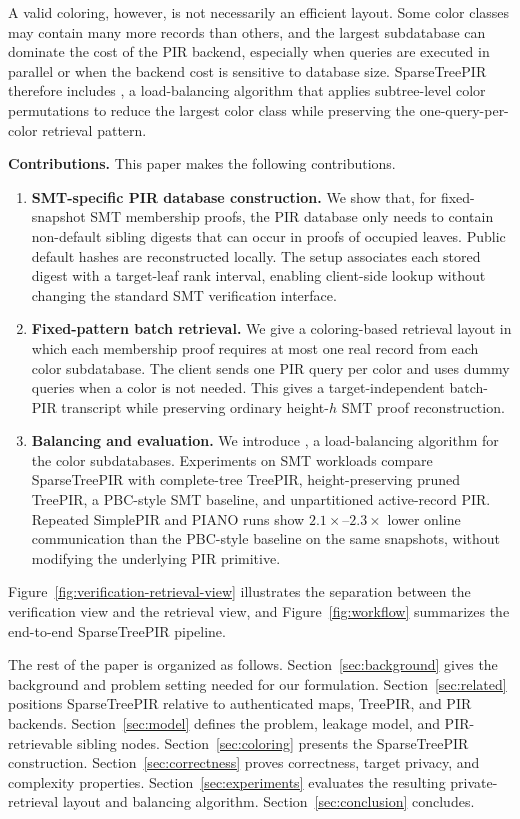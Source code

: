 A valid coloring, however, is not necessarily an efficient layout. Some color classes may contain many more records than others, and the largest subdatabase can dominate the cost of the PIR backend, especially when queries are executed in parallel or when the backend cost is sensitive to database size. SparseTreePIR therefore includes \ActiveBalance{}, a load-balancing algorithm that applies subtree-level color permutations to reduce the largest color class while preserving the one-query-per-color retrieval pattern.

\textbf{Contributions.} This paper makes the following contributions.
\begin{enumerate}[leftmargin=2em]
	\item \textbf{SMT-specific PIR database construction.} We show that, for fixed-snapshot SMT membership proofs, the PIR database only needs to contain non-default sibling digests that can occur in proofs of occupied leaves. Public default hashes are reconstructed locally. The setup associates each stored digest with a target-leaf rank interval, enabling client-side lookup without changing the standard SMT verification interface.
	\item \textbf{Fixed-pattern batch retrieval.} We give a coloring-based retrieval layout in which each membership proof requires at most one real record from each color subdatabase. The client sends one PIR query per color and uses dummy queries when a color is not needed. This gives a target-independent batch-PIR transcript while preserving ordinary height-$h$ SMT proof reconstruction.
	\item \textbf{Balancing and evaluation.} We introduce \ActiveBalance{}, a load-balancing algorithm for the color subdatabases. Experiments on SMT workloads compare SparseTreePIR with complete-tree TreePIR, height-preserving pruned TreePIR, a PBC-style SMT baseline, and unpartitioned active-record PIR. Repeated SimplePIR and PIANO runs show $2.1\times$--$2.3\times$ lower online communication than the PBC-style baseline on the same snapshots, without modifying the underlying PIR primitive.
\end{enumerate}

Figure~\ref{fig:verification-retrieval-view} illustrates the separation between the verification view and the retrieval view, and Figure~\ref{fig:workflow} summarizes the end-to-end SparseTreePIR pipeline.

The rest of the paper is organized as follows. Section~\ref{sec:background} gives the background and problem setting needed for our formulation. Section~\ref{sec:related} positions SparseTreePIR relative to authenticated maps, TreePIR, and PIR backends. Section~\ref{sec:model} defines the problem, leakage model, and PIR-retrievable sibling nodes. Section~\ref{sec:coloring} presents the SparseTreePIR construction. Section~\ref{sec:correctness} proves correctness, target privacy, and complexity properties. Section~\ref{sec:experiments} evaluates the resulting private-retrieval layout and balancing algorithm. Section~\ref{sec:conclusion} concludes.

